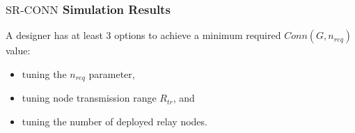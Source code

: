 \documentclass{beamer}
\newcommand{\SRCONN}   { {\mathrm {SR\mbox{-}CONN}} }
\begin{document}
%
%
\begin{frame}
\frametitle{$\SRCONN$ Simulation Results}
A designer has at least 3 options to achieve a minimum required $Conn(G,n_{req})$ value:

\begin{itemize}
\item tuning the $n_{req}$ parameter,
\item tuning node transmission range $R_{tr}$, and
\item tuning the number of deployed relay nodes.
\end{itemize}
\end{frame}
\end{document}
